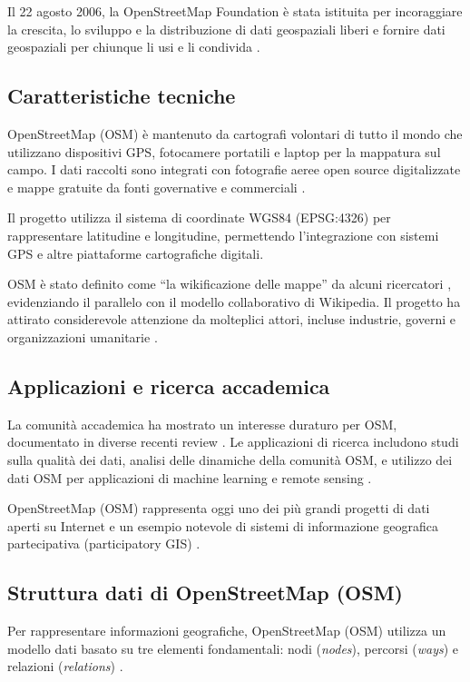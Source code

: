 Il 22 agosto 2006, la OpenStreetMap Foundation è stata istituita per incoraggiare la crescita, lo sviluppo e la distribuzione di dati geospaziali liberi e fornire dati geospaziali per chiunque li usi e li condivida \cite{osmfoundation2006}.

\subsection{Caratteristiche tecniche}

OpenStreetMap (OSM) è mantenuto da cartografi volontari di tutto il mondo che utilizzano dispositivi GPS, fotocamere portatili e laptop per la mappatura sul campo. I dati raccolti sono integrati con fotografie aeree open source digitalizzate e mappe gratuite da fonti governative e commerciali \cite{neis2012}.

Il progetto utilizza il sistema di coordinate WGS84 (EPSG:4326) per rappresentare latitudine e longitudine, permettendo l'integrazione con sistemi GPS e altre piattaforme cartografiche digitali.

OSM è stato definito come ``la wikificazione delle mappe'' da alcuni ricercatori \cite{sehra2013}, evidenziando il parallelo con il modello collaborativo di Wikipedia. Il progetto ha attirato considerevole attenzione da molteplici attori, incluse industrie, governi e organizzazioni umanitarie \cite{fonte2022}.

\subsection{Applicazioni e ricerca accademica}

La comunità accademica ha mostrato un interesse duraturo per OSM, documentato in diverse recenti review \cite{vargas2020, sehra2013}. Le applicazioni di ricerca includono studi sulla qualità dei dati, analisi delle dinamiche della comunità OSM, e utilizzo dei dati OSM per applicazioni di machine learning e remote sensing \cite{vargas2020}.

OpenStreetMap (OSM) rappresenta oggi uno dei più grandi progetti di dati aperti su Internet e un esempio notevole di sistemi di informazione geografica partecipativa (participatory GIS) \cite{quinn2022}.

\subsection{Struttura dati di OpenStreetMap (OSM)}

Per rappresentare informazioni geografiche, OpenStreetMap (OSM) utilizza un modello dati basato su tre elementi fondamentali: nodi (\textit{nodes}), percorsi (\textit{ways}) e relazioni (\textit{relations}) \cite{elements2024}.


